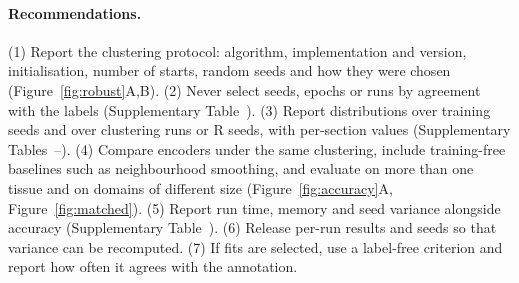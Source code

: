 \documentclass[unnumsec,webpdf,contemporary,large]{oup-authoring-template}
\newcommand{\figref}[1]{Figure~\ref{#1}}
\begin{document}
\paragraph{Recommendations.}
(1) Report the clustering protocol: algorithm, implementation and version, initialisation, number of starts, random seeds and how
they were chosen (\figref{fig:robust}A,B).
(2) Never select seeds, epochs or runs by agreement with the labels (Supplementary Table~\STepoch).
(3) Report distributions over training seeds and over clustering runs or R seeds, with per-section values (Supplementary
Tables~\STseeds--\STmclust).
(4) Compare encoders under the same clustering, include training-free baselines such as neighbourhood smoothing, and evaluate on
more than one tissue and on domains of different size (\figref{fig:accuracy}A, \figref{fig:matched}).
(5) Report run time, memory and seed variance alongside accuracy (Supplementary Table~\STres).
(6) Release per-run results and seeds so that variance can be recomputed.
(7) If fits are selected, use a label-free criterion and report how often it agrees with the annotation.
\end{document}
